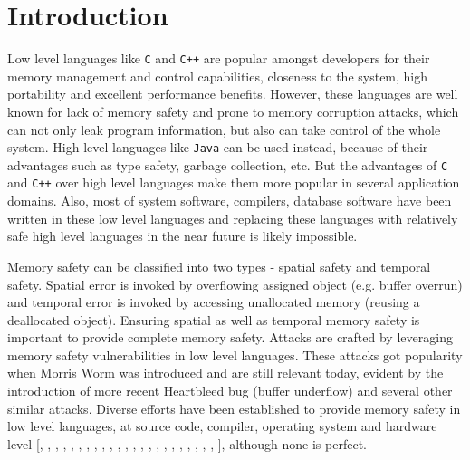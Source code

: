 
\chapter{Introduction}
Low level languages like \texttt{C} and \texttt{C++} are popular amongst developers for their memory management and control capabilities, closeness to the system, high portability and excellent performance benefits. However, these languages are well known for lack of memory safety and prone to memory corruption attacks, which can not only leak program information, but also can take control of the whole system. High level languages like \texttt{Java} can be used instead, because of their advantages such as type safety, garbage collection, etc. But the advantages of \texttt{C} and \texttt{C++} over high level languages make them more popular in several application domains. Also, most of system software, compilers, database software have been written in these low level languages and replacing these languages with relatively safe high level languages in the near future is likely impossible.

Memory safety can be classified into two types - spatial safety and temporal safety. Spatial error is invoked by overflowing assigned object (e.g. buffer overrun) and temporal error is invoked by accessing unallocated memory (reusing a deallocated object). Ensuring spatial as well as temporal memory safety is important to provide complete memory safety. Attacks are crafted by leveraging memory safety vulnerabilities in low level languages. These attacks got popularity when Morris Worm \citep{Spafford:1989:IWP:66093.66095} was introduced and are still relevant today, evident by the introduction of more recent Heartbleed bug (buffer underflow) \citep{durumeric2014matter} and several other similar attacks. Diverse efforts have been established to provide memory safety in low level languages, at source code, compiler, operating system and hardware level [\citep{nagarakatte2009softbound}, \citep{dynamicinstrumentationusage}, \citep{dhurjati2006backwards}, \citep{dhurjati2006safecode}, \citep{lattner2005automatic}, \citep{ruwase2004practical}, \citep{akritidis2009baggy}, \citep{Hasabnis:2012:LBC:2259016.2259034}, \cite{Necula:2002:CTR:565816.503286}, \citep{Jim:2002:CSD:647057.713871}, \citep{devietti2008hardbound}, \citep{austin1994efficient}, \citep{patil1995efficient}, \citep{yong2003protecting}, \citep{xu2004efficient}, \citep{nagarakatte2012watchdog}, \citep{nagarakatte2014watchdoglite}, \citep{simpson2013memsafe}, \citep{Das:2019:SRP:3316482.3326356}, \citep{serebryany2012addresssanitizer}, \citep{kuznetsov2014code}, \citep{nagarakatte2010cets}, \citep{nagarakatte2015everything}, \citep{oleksenko2017intel}], although none is perfect.

